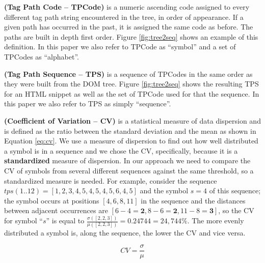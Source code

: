 \documentclass{vldb}
\begin{document}
\begin{definition}\textbf{(Tag Path Code -- TPCode)}\label{def:tpc} is a numeric
ascending code assigned to every different tag path string encountered in the
tree, in order of appearance. If a given path has occurred in the past, it is
assigned the same code as before. The paths are built in depth first order.
Figure \ref{fig:tree2seq} shows an example of this definition. In this paper we
also refer to TPCode as ``symbol'' and a set of TPCodes as ``alphabet''.
\end{definition}

\begin{definition}\textbf{(Tag Path Sequence -- TPS)} is a sequence of TPCodes
in the same order as they were built from the DOM tree. Figure \ref{fig:tree2seq} shows
the resulting TPS for an HTML snippet as  well as the set of TPCode used for that
the sequence. In this paper we also refer to TPS as simply ``sequence''.
\end{definition}

\begin{definition}\textbf{(Coefficient of Variation -- CV)}\label{def:cv} is a
statistical measure of data dispersion and is defined as the ratio between the
standard deviation and the mean as shown in Equation
\ref{eq:cv}\cite{CVeveritt2006cambridge}. We use a measure of dispersion to find
out how well distributed a symbol is in a sequence and we chose the CV,
specifically, because it is a \textbf{standardized} measure of dispersion. In
our approach we need to compare the CV of symbols from several different
sequences against the same threshold, so a standardized measure is needed.
For example, consider the sequence $tps(1..12)=[1,2,3,4,5,4,5,4,5,6,4,5]$ and
the symbol $s=4$ of this sequence; the symbol occurs at positions $[4,6,8,11]$
in the sequence and the distances between adjacent occurrences are
$[6-4=\textbf{2},8-6=\textbf{2},11-8=\textbf{3}]$, so the CV for symbol ``$s$''
is equal to $\frac{\sigma([2, 2, 3])}{\mu([2, 2, 3])}=0.24744=24,744\%$. The
more evenly distributed a symbol is, along the sequence, the lower the CV and
vice versa.

\begin{equation}\label{eq:cv}
    CV=\frac{\sigma}{\mu}
\end{equation}
\end{definition}
\end{document}
